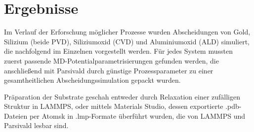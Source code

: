 \chapter{Ergebnisse}

Im Verlauf der Erforschung möglicher Prozesse wurden Abscheidungen von Gold, Silizium (beide PVD), Siliziumoxid (CVD) und Aluminiumoxid (ALD) simuliert, die nachfolgend im Einzelnen vorgestellt werden.
Für jedes System mussten zuerst passende MD-Potential\-para\-metri\-sierungen gefunden werden, die anschließend mit Parsivald durch günstige Prozessparameter zu einer gesamtheitlichen Abscheidungssimulation gepackt wurden.

Präparation der Substrate geschah entweder durch Relaxation einer zufälligen Struktur in LAMMPS, oder mittels Materials Studio, dessen exportierte .pdb-Dateien per Atomsk in .lmp-Formate überführt wurden, die von LAMMPS und Parsivald lesbar sind.


\clearpage

\clearpage

\clearpage

\clearpage


